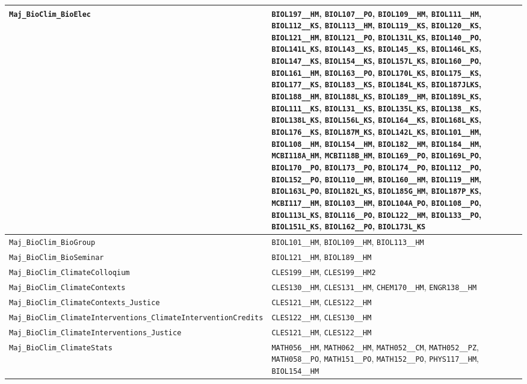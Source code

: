 \begin{longtable}{|p{4.4in}|p{4.4in}|}
    \verb|Maj_BioClim_BioElec| & \verb|BIOL197__HM|, \verb|BIOL107__PO|, \verb|BIOL109__HM|, \verb|BIOL111__HM|, \verb|BIOL112__KS|, \verb|BIOL113__HM|, \verb|BIOL119__KS|, \verb|BIOL120__KS|, \verb|BIOL121__HM|, \verb|BIOL121__PO|, \verb|BIOL131L_KS|, \verb|BIOL140__PO|, \verb|BIOL141L_KS|, \verb|BIOL143__KS|, \verb|BIOL145__KS|, \verb|BIOL146L_KS|, \verb|BIOL147__KS|, \verb|BIOL154__KS|, \verb|BIOL157L_KS|, \verb|BIOL160__PO|, \verb|BIOL161__HM|, \verb|BIOL163__PO|, \verb|BIOL170L_KS|, \verb|BIOL175__KS|, \verb|BIOL177__KS|, \verb|BIOL183__KS|, \verb|BIOL184L_KS|, \verb|BIOL187JLKS|, \verb|BIOL188__HM|, \verb|BIOL188L_KS|, \verb|BIOL189__HM|, \verb|BIOL189L_KS|, \verb|BIOL111__KS|, \verb|BIOL131__KS|, \verb|BIOL135L_KS|, \verb|BIOL138__KS|, \verb|BIOL138L_KS|, \verb|BIOL156L_KS|, \verb|BIOL164__KS|, \verb|BIOL168L_KS|, \verb|BIOL176__KS|, \verb|BIOL187M_KS|, \verb|BIOL142L_KS|, \verb|BIOL101__HM|, \verb|BIOL108__HM|, \verb|BIOL154__HM|, \verb|BIOL182__HM|, \verb|BIOL184__HM|, \verb|MCBI118A_HM|, \verb|MCBI118B_HM|, \verb|BIOL169__PO|, \verb|BIOL169L_PO|, \verb|BIOL170__PO|, \verb|BIOL173__PO|, \verb|BIOL174__PO|, \verb|BIOL112__PO|, \verb|BIOL152__PO|, \verb|BIOL110__HM|, \verb|BIOL160__HM|, \verb|BIOL119__HM|, \verb|BIOL163L_PO|, \verb|BIOL182L_KS|, \verb|BIOL185G_HM|, \verb|BIOL187P_KS|, \verb|MCBI117__HM|, \verb|BIOL103__HM|, \verb|BIOL104A_PO|, \verb|BIOL108__PO|, \verb|BIOL113L_KS|, \verb|BIOL116__PO|, \verb|BIOL122__HM|, \verb|BIOL133__PO|, \verb|BIOL151L_KS|, \verb|BIOL162__PO|, \verb|BIOL173L_KS|\\\hline
    \verb|Maj_BioClim_BioGroup| & \verb|BIOL101__HM|, \verb|BIOL109__HM|, \verb|BIOL113__HM|\\\hline
    \verb|Maj_BioClim_BioSeminar| & \verb|BIOL121__HM|, \verb|BIOL189__HM|\\\hline
    \verb|Maj_BioClim_ClimateColloqium| & \verb|CLES199__HM|, \verb|CLES199__HM2|\\\hline
    \verb|Maj_BioClim_ClimateContexts| & \verb|CLES130__HM|, \verb|CLES131__HM|, \verb|CHEM170__HM|, \verb|ENGR138__HM|\\\hline
    \verb|Maj_BioClim_ClimateContexts_Justice| & \verb|CLES121__HM|, \verb|CLES122__HM|\\\hline
    \verb|Maj_BioClim_ClimateInterventions_ClimateInterventionCredits| & \verb|CLES122__HM|, \verb|CLES130__HM|\\\hline
    \verb|Maj_BioClim_ClimateInterventions_Justice| & \verb|CLES121__HM|, \verb|CLES122__HM|\\\hline
    \verb|Maj_BioClim_ClimateStats| & \verb|MATH056__HM|, \verb|MATH062__HM|, \verb|MATH052__CM|, \verb|MATH052__PZ|, \verb|MATH058__PO|, \verb|MATH151__PO|, \verb|MATH152__PO|, \verb|PHYS117__HM|, \verb|BIOL154__HM|\\\hline

\end{longtable}
